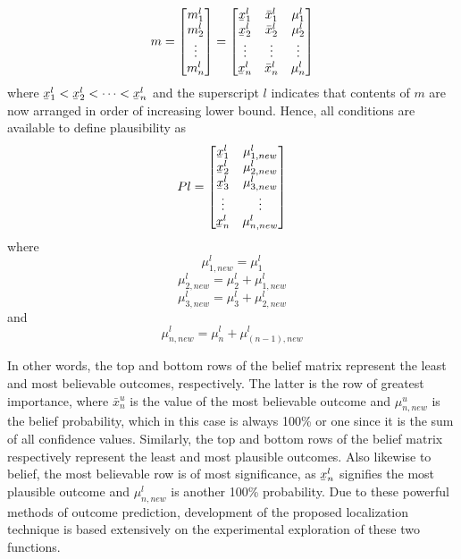 \documentclass[12pt]{uthesis-v12}  %
\newcommand{\ubar}[1]{\underaccent{\bar}{#1}}
\begin{document}
\begin{equation}
m = \begin{bmatrix*}
m_1^l \\
m_2^l \\
\vdots \\
m_n^l \end{bmatrix*}
= \begin{bmatrix*}
\ubar{x}_1^l & \bar{x}_1^l & \mu_1^l \\
\ubar{x}_2^l & \bar{x}_2^l & \mu_2^l \\
\vdots & \vdots & \vdots \\
\ubar{x}_n^l & \bar{x}_n^l & \mu_n^l \\ \end{bmatrix*}
\label{mu}
\end{equation}
\noindent where $\ubar{x}_{1}^{l} < \ubar{x}_{2}^{l} < \dots < \ubar{x}_{n}^{l}$ and the superscript $l$ indicates that contents of $m$ are now arranged in order of increasing lower bound. Hence, all conditions are available to define plausibility as
\begin{equation}
Pl = \begin{bmatrix*}
\ubar{x}_1^l & \mu_{1,new}^l \\
\ubar{x}_2^l & \mu_{2,new}^l \\
\ubar{x}_3^l & \mu_{3,new}^l \\
\vdots & \vdots \\
\ubar{x}_n^l & \mu_{n,new}^l \end{bmatrix*}
\label{m}
\end{equation}
\noindent where
\begin{equation}
\mu_{1,new}^l = \mu_1^l
\label{mu1u}
\end{equation}
\begin{equation}
\mu_{2,new}^l = \mu_2^l+\mu_{1,new}^l
\label{mu2u}
\end{equation}
\begin{equation}
\mu_{3,new}^l = \mu_3^l+\mu_{2,new}^l
\label{mu3u}
\end{equation}
\noindent and
\begin{equation}
\mu_{n,new}^l = \mu_n^l+\mu_{(n-1),new}^l
\label{munu}
\end{equation}

In other words, the top and bottom rows of the belief matrix represent the least and most believable outcomes, respectively. The latter is the row of greatest importance, where $\bar{x}_n^u$ is the value of the most believable outcome and $\mu_{n,new}^u$ is the belief probability, which in this case is always 100\% or one since it is the sum of all confidence values. Similarly, the top and bottom rows of the belief matrix respectively represent the least and most plausible outcomes. Also likewise to belief, the most believable row is of most significance, as $\ubar{x}_n^l$ signifies the most plausible outcome and $\mu_{n,new}^l$ is another 100\% probability. Due to these powerful methods of outcome prediction, development of the proposed localization technique is based extensively on the experimental exploration of these two functions.
\end{document}
